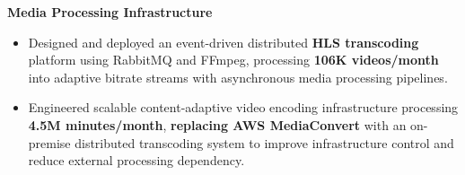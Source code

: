 \documentclass[10pt,a4paper]{article}
\begin{document}
\vspace{0pt}
\textbf{Media Processing Infrastructure}

\begin{itemize}[leftmargin=*,
itemsep=1pt,
topsep=0pt,
parsep=1pt,
partopsep=1pt]

\item Designed and deployed an event-driven distributed \textbf{HLS transcoding} platform using RabbitMQ and FFmpeg, processing \textbf{106K videos/month} into adaptive bitrate streams with asynchronous media processing pipelines.

\item Engineered scalable content-adaptive video encoding infrastructure processing \textbf{4.5M minutes/month}, \textbf{replacing AWS MediaConvert} with an on-premise distributed transcoding system to improve infrastructure control and reduce external processing dependency.
\end{itemize}
\end{document}

